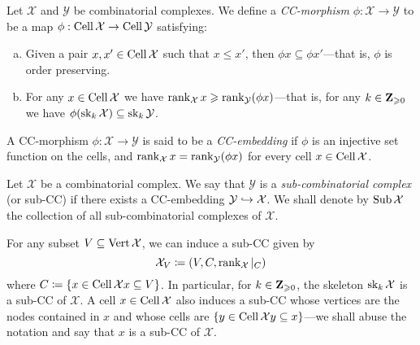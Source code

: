 \begin{definition}
\label{def:cc-morphism}
Let \(\mathcal{X}\) and \(\mathcal{Y}\) be combinatorial complexes. We define a \emph{CC-morphism}
\(\phi: \mathcal{X} \to \mathcal{Y}\) to be a map \(\phi: \operatorname{Cell} \mathcal{X} \to \operatorname{Cell} \mathcal{Y}\) satisfying:
\begin{enumerate}[(a)]\setlength\itemsep{0em}
\item Given a pair \(x, x' \in \operatorname{Cell} \mathcal{X}\) such that \(x \leq x'\), then \(\phi x \subseteq \phi
  x'\)---that is, \(\phi\) is order preserving.
\item For any \(x \in \operatorname{Cell} \mathcal{X}\) we have
  \(\operatorname{rank}_{\mathcal{X}} x \geqslant \operatorname{rank}_{\mathcal{Y}}(\phi x)\)---that is, for any
  \(k \in \mathbf{Z}_{\geqslant 0}\) we have \(\phi(\operatorname{sk}_k \mathcal{X}) \subseteq \operatorname{sk}_k \mathcal{Y}\).
\end{enumerate}
\end{definition}

\begin{definition}
\label{def:cc-embedding}
A CC-morphism \(\phi: \mathcal{X} \to \mathcal{Y}\) is said to be a \emph{CC-embedding} if
\(\phi\) is an injective set function on the cells, and
\(\operatorname{rank}_{\mathcal{X}} x = \operatorname{rank}_{\mathcal{Y}}(\phi x)\) for every cell \(x \in \operatorname{Cell} \mathcal{X}\).
\end{definition}

\begin{definition}
\label{def:sub-combinatorial-complex}
Let \(\mathcal{X}\) be a combinatorial complex. We say that \(\mathcal{Y}\) is a
\emph{sub-combinatorial complex} (or sub-CC) if there exists a CC-embedding
\(\mathcal{Y} \hookrightarrow \mathcal{X}\). We shall denote by \(\operatorname{Sub} \mathcal{X}\) the collection of all
sub-combinatorial complexes of \(\mathcal{X}\).
\end{definition}

\begin{example}
\label{exp:sub-cc}
For any subset \(V \subseteq \operatorname{Vert} \mathcal{X}\), we can induce a sub-CC given by
\[
\mathcal{X}_V \coloneq (V, C, \operatorname{rank}_{\mathcal{X}}|_C)
\]
where \(C \coloneq \{x \in \operatorname{Cell} \mathcal{X} \relax x \subseteq V\}\). In particular, for
\(k \in \mathbf{Z}_{\geqslant 0}\), the skeleton \(\operatorname{sk}_k \mathcal{X}\) is a sub-CC of \(\mathcal{X}\). A cell \(x \in
\operatorname{Cell} \mathcal{X}\) also induces a sub-CC whose vertices are the nodes contained in \(x\)
and whose cells are \(\{y \in \operatorname{Cell} \mathcal{X} \relax y \subseteq x\}\)---we shall abuse the notation
and say that \(x\) is a sub-CC of \(\mathcal{X}\).
\end{example}


